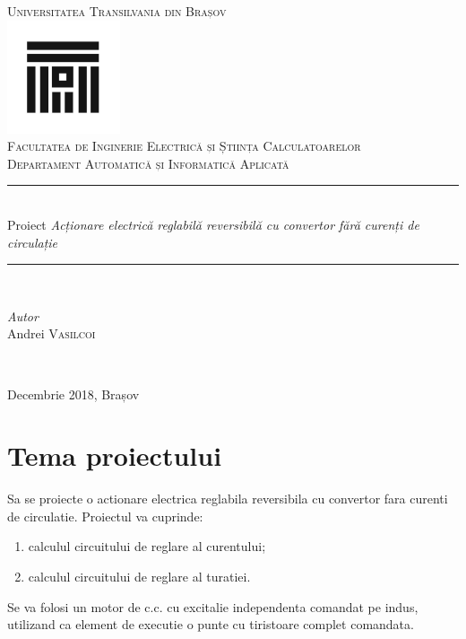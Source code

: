 \documentclass[11pt]{article}
\author{Andrei Vasilcoi}
\begin{document}
\begin{titlepage}

\newcommand{\HRule}{\rule{\linewidth}{0.5mm}}
	
\begin{center}
\textsc{\LARGE Universitatea Transilvania din Brașov}\\[0.5cm]
\includegraphics[width=0.25\textwidth]{logo_ut.jpg}\\[0.5cm]
\textsc{\Large Facultatea de Inginerie Electrică și Știința Calculatoarelor}\\[0.5cm]
\textsc{\large Departament Automatică și Informatică Aplicată}\\[1.5cm]
\HRule\\[0.5cm]
{\Large Proiect \textit{Acționare electrică reglabilă reversibilă cu convertor fără curenți de circulație}}\\[0.5cm]
\HRule\\[2.5cm]
\begin{minipage}{1\textwidth}
	\begin{flushleft}
		\large
		\textit{Autor}\\
		Andrei \textsc{Vasilcoi}\\
	\end{flushleft}
\end{minipage}
~
\end{center}
\centering
\vspace{5cm}
{\large Decembrie 2018, Brașov}\\[5cm]
\end{titlepage}

\newpage
{}
\tableofcontents

\newpage	
\section{Tema proiectului}

Sa se proiecte o actionare electrica reglabila reversibila cu convertor fara curenti de circulatie. Proiectul va cuprinde: 
\begin{enumerate}[label=$\bullet$]
	\item calculul circuitului de reglare al curentului; 
	\item calculul circuitului de reglare al turatiei. 
\end{enumerate}
Se va folosi un motor de c.c. cu excitalie independenta comandat pe indus, utilizand ca element de executie o punte cu tiristoare complet comandata.
\end{document}
